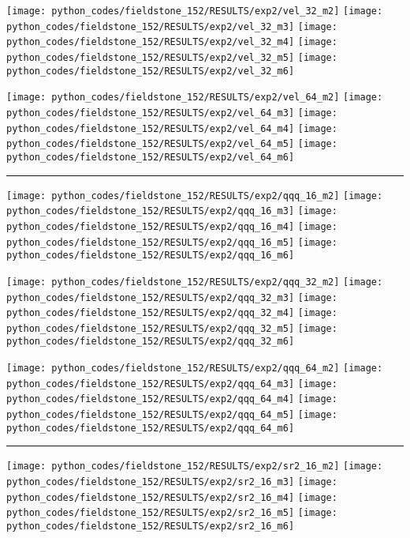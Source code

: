 \noindent
\texttt{[image: python\_codes/fieldstone\_152/RESULTS/exp2/vel\_32\_m2]}
\texttt{[image: python\_codes/fieldstone\_152/RESULTS/exp2/vel\_32\_m3]}
\texttt{[image: python\_codes/fieldstone\_152/RESULTS/exp2/vel\_32\_m4]}
\texttt{[image: python\_codes/fieldstone\_152/RESULTS/exp2/vel\_32\_m5]}
\texttt{[image: python\_codes/fieldstone\_152/RESULTS/exp2/vel\_32\_m6]}

\noindent
\texttt{[image: python\_codes/fieldstone\_152/RESULTS/exp2/vel\_64\_m2]}
\texttt{[image: python\_codes/fieldstone\_152/RESULTS/exp2/vel\_64\_m3]}
\texttt{[image: python\_codes/fieldstone\_152/RESULTS/exp2/vel\_64\_m4]}
\texttt{[image: python\_codes/fieldstone\_152/RESULTS/exp2/vel\_64\_m5]}
\texttt{[image: python\_codes/fieldstone\_152/RESULTS/exp2/vel\_64\_m6]}

\hrule

\noindent
\texttt{[image: python\_codes/fieldstone\_152/RESULTS/exp2/qqq\_16\_m2]}
\texttt{[image: python\_codes/fieldstone\_152/RESULTS/exp2/qqq\_16\_m3]}
\texttt{[image: python\_codes/fieldstone\_152/RESULTS/exp2/qqq\_16\_m4]}
\texttt{[image: python\_codes/fieldstone\_152/RESULTS/exp2/qqq\_16\_m5]}
\texttt{[image: python\_codes/fieldstone\_152/RESULTS/exp2/qqq\_16\_m6]}

\noindent
\texttt{[image: python\_codes/fieldstone\_152/RESULTS/exp2/qqq\_32\_m2]}
\texttt{[image: python\_codes/fieldstone\_152/RESULTS/exp2/qqq\_32\_m3]}
\texttt{[image: python\_codes/fieldstone\_152/RESULTS/exp2/qqq\_32\_m4]}
\texttt{[image: python\_codes/fieldstone\_152/RESULTS/exp2/qqq\_32\_m5]}
\texttt{[image: python\_codes/fieldstone\_152/RESULTS/exp2/qqq\_32\_m6]}

\noindent
\texttt{[image: python\_codes/fieldstone\_152/RESULTS/exp2/qqq\_64\_m2]}
\texttt{[image: python\_codes/fieldstone\_152/RESULTS/exp2/qqq\_64\_m3]}
\texttt{[image: python\_codes/fieldstone\_152/RESULTS/exp2/qqq\_64\_m4]}
\texttt{[image: python\_codes/fieldstone\_152/RESULTS/exp2/qqq\_64\_m5]}
\texttt{[image: python\_codes/fieldstone\_152/RESULTS/exp2/qqq\_64\_m6]}

\hrule

\noindent
\texttt{[image: python\_codes/fieldstone\_152/RESULTS/exp2/sr2\_16\_m2]}
\texttt{[image: python\_codes/fieldstone\_152/RESULTS/exp2/sr2\_16\_m3]}
\texttt{[image: python\_codes/fieldstone\_152/RESULTS/exp2/sr2\_16\_m4]}
\texttt{[image: python\_codes/fieldstone\_152/RESULTS/exp2/sr2\_16\_m5]}
\texttt{[image: python\_codes/fieldstone\_152/RESULTS/exp2/sr2\_16\_m6]}

